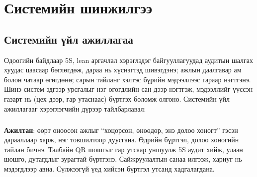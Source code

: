 
\chapter{Системийн шинжилгээ}
\label{Chapter2}

\newcommand{\usecase}[9]{%
\begin{longtable}{|p{3.4cm}|p{11.2cm}|}
\caption{#1 юзкейсийн тодорхойлолт}\label{table:uc#2}\\ \hline
\textbf{Юзкейс:} & #1 \\ \hline
\textbf{ID:} & UC-#2 \\ \hline
\textbf{Үүсгэсэн:} & \shortname \\ \hline
\textbf{Шинэчилсэн огноо:} & 2026.10.23 \\ \hline
\textbf{Үндсэн тоглогч:} & #3 \\ \hline
\textbf{Нэмэлт тоглогч:} & #4 \\ \hline
\textbf{Товч тайлбар:} & #5 \\ \hline
\textbf{Өмнөх нөхцөл:} & #6 \\ \hline
\textbf{Үндсэн урсгал:} & #7 \\ \hline
\textbf{Дараах нөхцөл:} & #8 \\ \hline
\textbf{Алтернатив урсгал:} & #9 \\ \hline
\end{longtable}}
\newcommand{\stereo}[1]{\guillemotleft#1\guillemotright}

\section{Системийн үйл ажиллагаа}
Одоогийн байдлаар 5S, lean аргачлал хэрэглэдэг байгууллагуудад аудитын шалгах хуудас цаасаар бөглөгдөж, дараа нь хүснэгтэд шивэгдэнэ; ажлын даалгавар ам болон чатаар өгөгдөнө; сарын тайланг хэлтэс бүрийн мэдээллээс гараар нэгтгэнэ. Шинэ систем эдгээр урсгалыг нэг өгөгдлийн сан дээр нэгтгэж, мэдээллийг үүссэн газарт нь (цех дээр, гар утаснаас) бүртгэх боломж олгоно. Системийн үйл ажиллагааг хэрэглэгчийн дүрээр тайлбарлавал:

\paragraph{}\textbf{Ажилтан}: өөрт оноосон ажлыг ``хоцорсон, өнөөдөр, энэ долоо хоногт'' гэсэн дарааллаар харж, нэг товшилтоор дуусгана. Өдрийн бүртгэл, долоо хоногийн тайлан бичнэ. Талбайн QR шошгыг гар утсаар уншуулж 5S аудит хийж, улаан шошго, дутагдлыг зурагтай бүртгэнэ. Сайжруулалтын санаа илгээж, хариуг нь мэдэгдлээр авна. Сүлжээгүй үед хийсэн бүртгэл утсанд хадгалагдана.

